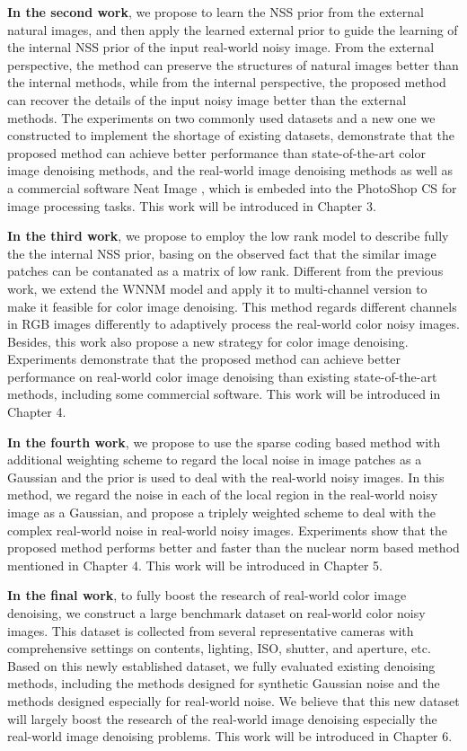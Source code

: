 \textbf{In the second work}, we propose to learn the NSS prior from the external natural images, and then apply the learned external prior to guide the learning of the internal NSS prior of the input real-world noisy image. From the external perspective, the method can preserve the structures of natural images better than the internal methods, while from the internal perspective, the proposed method can recover the details of the input noisy image better than the external methods. The experiments on two commonly used datasets and a new one we constructed to implement the shortage of existing datasets, demonstrate that the proposed method can achieve better performance than state-of-the-art color image denoising methods, and the real-world image denoising methods as well as a commercial software Neat Image \cite{neatimage}, which is embeded into the PhotoShop CS for image processing tasks. This work will be introduced in Chapter 3.


\textbf{In the third work}, we propose to employ the low rank model to describe fully the the internal NSS prior, basing on the observed fact that the similar image patches can be contanated as a matrix of low rank. Different from the previous work, we extend the WNNM model \cite{wnnm} and apply it to multi-channel version to make it feasible for color image denoising. This method regards different channels in RGB images differently to adaptively process the real-world color noisy images. Besides, this work also propose a new strategy for color image denoising. Experiments demonstrate that the proposed method can achieve better performance on real-world color image denoising than existing state-of-the-art methods, including some commercial software. This work will be introduced in Chapter 4.


\textbf{In the fourth work}, we propose to use the sparse coding based method with additional weighting scheme to regard the local noise in image patches as a Gaussian and the prior is used to deal with the real-world noisy images. In this method, we regard the noise in each of the local region in the real-world noisy image as a Gaussian, and propose a triplely weighted scheme to deal with the complex real-world noise in real-world noisy images. Experiments show that the proposed method performs better and faster than the nuclear norm based method mentioned in Chapter 4. This work will be introduced in Chapter 5.


\textbf{In the final work}, to fully boost the research of real-world color image denoising, we construct a large benchmark dataset on real-world color noisy images. This dataset is collected from several representative cameras with comprehensive settings on contents, lighting, ISO, shutter, and aperture, etc. Based on this newly established dataset, we fully evaluated existing denoising methods, including the methods designed for synthetic Gaussian noise and the methods designed especially for real-world noise. We believe that this new dataset will largely boost the research of the real-world image denoising especially the real-world image denoising problems. This work will be introduced in Chapter 6.


